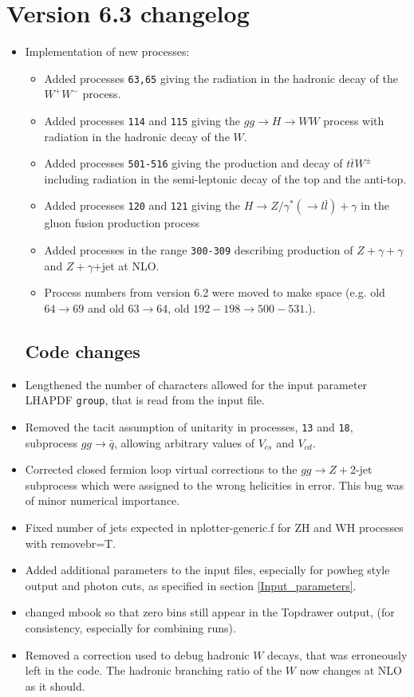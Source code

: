 \documentclass[12pt]{article}
\begin{document}
\section{Version 6.3 changelog}
\label{changelog6.3}

\begin{itemize}
\item Implementation of new processes:
\begin{itemize}
\item
Added processes {\tt 63,65} giving the radiation in the hadronic decay of the $W^+W^-$ process. 
\item 
Added processes {\tt 114} and {\tt 115} giving the $gg\to H\to WW$ process with radiation in the hadronic decay of the $W$.
\item 
Added processes {\tt 501-516} giving the production and decay of 
$t \bar{t} W^\pm$ including radiation in the semi-leptonic decay of the top and the anti-top.
\item 
Added processes {\tt 120} and {\tt 121} giving the $H\to Z/\gamma^*(\to l \bar{l})+\gamma$ 
in the gluon fusion production process
\item 
Added processes in the range {\tt 300-309} describing production of $Z+\gamma+\gamma$ 
and $Z+\gamma$+jet at NLO.
\item
Process numbers from version 6.2 were moved to make space 
(e.g. old $64 \to 69$ and old $63\to 64$, old $192-198 \to 500-531$.). 
\end{itemize}
\subsection{Code changes}
\item Lengthened the number of characters allowed for the input parameter LHAPDF {\tt group}, 
that is read from the input file.
\item Removed the tacit assumption of unitarity in processes, {\tt 13} and {\tt 18}, 
subprocess $gg \to \bar{q}$, 
allowing arbitrary values of $V_{cs}$ and $V_{cd}$.  
\item 
Corrected closed fermion loop virtual corrections to the $gg \to Z+2$-jet subprocess which were assigned to the wrong 
helicities in error. This bug was of minor numerical importance. 
\item
Fixed number of jets expected in nplotter-generic.f for ZH and WH processes with removebr=T.
\item
Added additional parameters to the input files, 
especially for powheg style output and photon cuts, as specified in section \ref{Input_parameters}.
\item 
changed mbook so that zero bins still appear in the Topdrawer output,
(for consistency, especially for combining runs).
\item
Removed a correction used to debug hadronic $W$ decays, that was erroneously left in the code.
The hadronic branching ratio of the $W$ now changes at NLO as it should.


\end{itemize}
\end{document}
